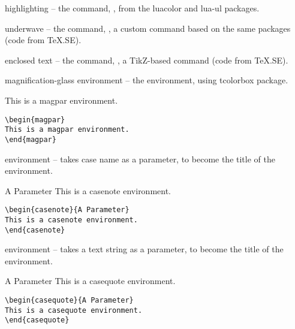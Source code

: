 \p highlighting -- the  command, , from the luacolor and lua-ul packages.

\p underwave -- the  command, , a custom command based on the same packages (code from TeX.SE).

\p enclosed text -- the  command, , a TikZ-based command (code from TeX.SE).

\p magnification-glass environment -- the  environment, using tcolorbox package.
\begin{magpar}
This is a magpar environment.
\end{magpar}

\begin{verbatim}
\begin{magpar}
This is a magpar environment.
\end{magpar}
\end{verbatim}

\p {} environment -- takes case name as a parameter, to become the title of the environment.

\begin{casenote}{A Parameter}
This is a casenote environment.
\end{casenote}

\begin{verbatim}
\begin{casenote}{A Parameter}
This is a casenote environment.
\end{casenote}
\end{verbatim}

\p {} environment -- takes a text string as a parameter, to become the title of the environment.

\begin{casequote}{A Parameter}
This is a casequote environment.
\end{casequote}

\begin{verbatim}
\begin{casequote}{A Parameter}
This is a casequote environment.
\end{casequote}
\end{verbatim}






